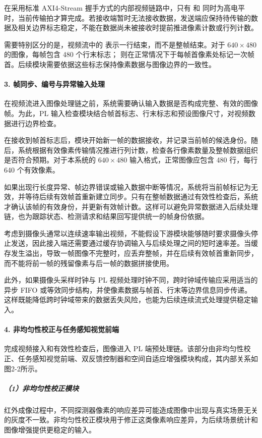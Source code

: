\documentclass[UTF8,a4paper,12pt,fontset=windows]{ctexart}
\begin{document}
在采用标准 AXI4-Stream 握手方式的内部视频链路中，只有  和  同时为高电平时，当前传输拍才算完成。若接收端暂时无法接收数据，发送端应保持待传输的数据及相关边界标志稳定，不能在数据尚未被接收时提前推进像素计数或行列计数。

需要特别区分的是，视频流中的  表示一行结束，而不是整帧结束。对于 \(640\times480\) 的图像，每帧包含 480 个行末标志； 则在正常情况下于每帧首像素处标记一次帧首。后续模块需要依据这些标志保持像素数据与图像边界的一致性。

\paragraph*{3. 帧同步、编号与异常输入处理}
在视频流进入图像处理链之前，系统需要确认输入数据是否构成完整、有效的图像帧。为此，PL 输入检查模块结合帧首标志、行末标志和预设图像尺寸，对视频数据进行边界检查。

在接收到帧首标志后，模块开始新一帧的数据接收，并记录当前帧的候选身份。随后，系统根据有效像素传输情况推进行列计数，检查各行像素数量及整帧数据组织是否符合预期。对于本系统的 \(640\times480\) 输入格式，正常图像应包含 480 行，每行 640 个有效像素。

如果出现行长度异常、帧边界错误或输入数据中断等情况，系统将当前帧标记为无效，并等待后续有效帧首重新建立同步。只有在整帧数据通过有效性检查后，系统才确认该帧的有效身份，并更新有效帧计数。这样可以避免异常数据进入后续处理链，也为跟踪状态、检测请求和结果回写提供统一的帧身份依据。

考虑到摄像头通常以连续速率输出视频，不能假设下游模块能够随时要求摄像头停止发送，因此接入端还需要通过缓存协调输入与后续处理之间的短时速率差。当缓存发生溢出，导致一帧图像不完整时，应丢弃整帧，并在后续有效帧首重新同步，而不能将前一帧的残留像素与后一帧的数据拼接使用。

此外，如果摄像头采样时钟与 PL 视频处理时钟不同，跨时钟域传输应采用适当的异步 FIFO 或等效同步结构，并使像素数据与帧首、行末等边界信息同步传递。这样既能降低跨时钟域带来的数据丢失风险，也能为后续连续流式处理提供稳定输入。

\paragraph*{4. 非均匀性校正与任务感知视觉前端}
完成视频接入和有效性检查后，图像进入 PL 端预处理链。该部分由非均匀性校正、任务感知视觉前端、双反馈控制器和空间自适应增强模块构成，其内部关系如图2-2所示。



\subparagraph*{（1）非均匀性校正模块}
红外成像过程中，不同探测器像素的响应差异可能造成图像中出现与真实场景无关的灰度不一致。非均匀性校正模块用于修正这类像素响应差异，为后续场景统计和图像增强提供更稳定的输入。
\end{document}
